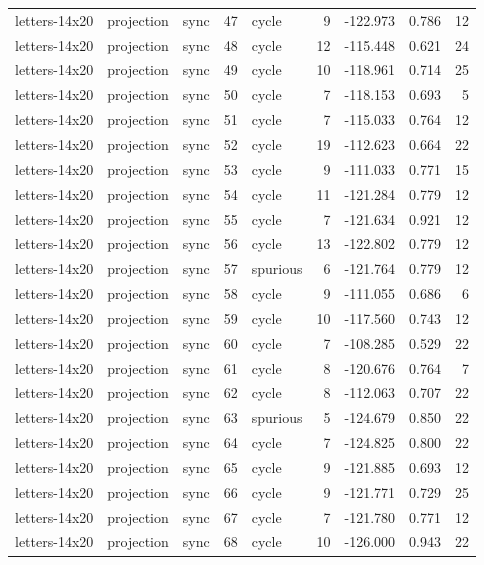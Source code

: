 \begin{tabular}{lllrlrrrr}
letters-14x20 & projection & sync & 47 & cycle & 9 & -122.973 & 0.786 & 12 \\
letters-14x20 & projection & sync & 48 & cycle & 12 & -115.448 & 0.621 & 24 \\
letters-14x20 & projection & sync & 49 & cycle & 10 & -118.961 & 0.714 & 25 \\
letters-14x20 & projection & sync & 50 & cycle & 7 & -118.153 & 0.693 & 5 \\
letters-14x20 & projection & sync & 51 & cycle & 7 & -115.033 & 0.764 & 12 \\
letters-14x20 & projection & sync & 52 & cycle & 19 & -112.623 & 0.664 & 22 \\
letters-14x20 & projection & sync & 53 & cycle & 9 & -111.033 & 0.771 & 15 \\
letters-14x20 & projection & sync & 54 & cycle & 11 & -121.284 & 0.779 & 12 \\
letters-14x20 & projection & sync & 55 & cycle & 7 & -121.634 & 0.921 & 12 \\
letters-14x20 & projection & sync & 56 & cycle & 13 & -122.802 & 0.779 & 12 \\
letters-14x20 & projection & sync & 57 & spurious & 6 & -121.764 & 0.779 & 12 \\
letters-14x20 & projection & sync & 58 & cycle & 9 & -111.055 & 0.686 & 6 \\
letters-14x20 & projection & sync & 59 & cycle & 10 & -117.560 & 0.743 & 12 \\
letters-14x20 & projection & sync & 60 & cycle & 7 & -108.285 & 0.529 & 22 \\
letters-14x20 & projection & sync & 61 & cycle & 8 & -120.676 & 0.764 & 7 \\
letters-14x20 & projection & sync & 62 & cycle & 8 & -112.063 & 0.707 & 22 \\
letters-14x20 & projection & sync & 63 & spurious & 5 & -124.679 & 0.850 & 22 \\
letters-14x20 & projection & sync & 64 & cycle & 7 & -124.825 & 0.800 & 22 \\
letters-14x20 & projection & sync & 65 & cycle & 9 & -121.885 & 0.693 & 12 \\
letters-14x20 & projection & sync & 66 & cycle & 9 & -121.771 & 0.729 & 25 \\
letters-14x20 & projection & sync & 67 & cycle & 7 & -121.780 & 0.771 & 12 \\
letters-14x20 & projection & sync & 68 & cycle & 10 & -126.000 & 0.943 & 22 \\

\end{tabular}

